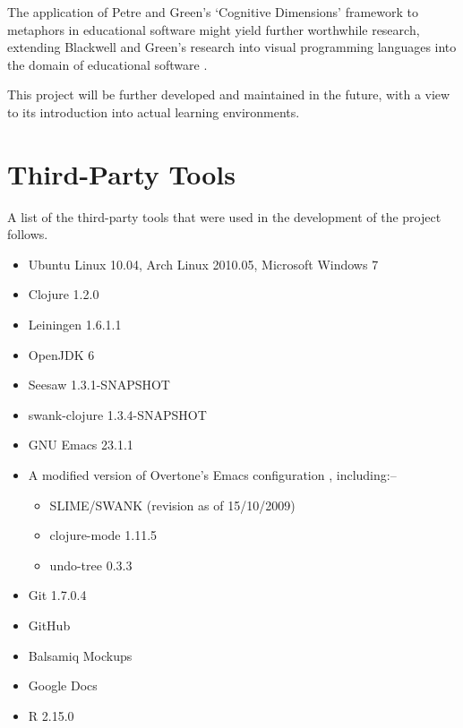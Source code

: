 \documentclass[12pt,twoside,notitlepage,xetex]{report}
\begin{document}
{The application of Petre and Green's `Cognitive Dimensions' framework to metaphors in educational software might yield further worthwhile research, extending Blackwell and Green's research into visual programming languages into the domain of educational software \cite{Green1996} \cite{Blackwell1999}.

This project will be further developed and maintained in the future, with a view to its introduction into actual learning environments.




\cleardoublepage



\cleardoublepage

\appendix

\chapter{Third-Party Tools}

A list of the third-party tools that were used in the development of the project follows.

\begin{itemize}
\item Ubuntu Linux 10.04, Arch Linux 2010.05, Microsoft Windows 7
\item Clojure 1.2.0
\item Leiningen 1.6.1.1
\item OpenJDK 6
\item Seesaw 1.3.1-SNAPSHOT
\item swank-clojure 1.3.4-SNAPSHOT
\item GNU Emacs 23.1.1
\item A modified version of Overtone's Emacs configuration \cite{OvertoneEmacsD}, including:--
\begin{itemize}
\item SLIME/SWANK (revision as of 15/10/2009)
\item clojure-mode 1.11.5
\item undo-tree 0.3.3
\end{itemize}
\item Git 1.7.0.4
\item GitHub
\item Balsamiq Mockups
\item Google Docs
\item R 2.15.0
\end{itemize}

}
\end{document}

